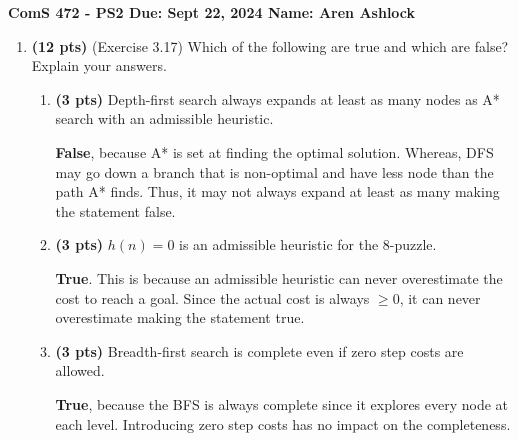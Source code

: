 \documentclass{article}
\begin{document}
\noindent\textbf{ComS 472 - PS2 \quad Due: Sept 22, 2024 \quad Name: Aren Ashlock}

\begin{enumerate}


\item \textbf{(12 pts)} (Exercise 3.17) Which of the following are true and which are false? Explain your answers.

    \begin{enumerate}[label=($\alph*$)]
    
    
    \item \textbf{(3 pts)} Depth-first search always expands at least as many nodes as A* search with an admissible heuristic.

    \color{blue}
        \textbf{False}, because A* is set at finding the optimal solution. Whereas, DFS may go down a branch that is non-optimal and have less node than the path A* finds. Thus, it may not always expand at least as many making the statement false.
    \color{black}



    \item \textbf{(3 pts)} $h(n) = 0$ is an admissible heuristic for the 8-puzzle.

    \color{blue}
        \textbf{True}. This is because an admissible heuristic can never overestimate the cost to reach a goal. Since the actual cost is always $\geq 0$, it can never overestimate making the statement true.
    \color{black}\addtocounter{enumii}{1}



    \item \textbf{(3 pts)} Breadth-first search is complete even if zero step costs are allowed.

    \color{blue}
        \textbf{True}, because the BFS is always complete since it explores every node at each level. Introducing zero step costs has no impact on the completeness.
    \color{black}


\end{enumerate}
\end{enumerate}
\end{document}
